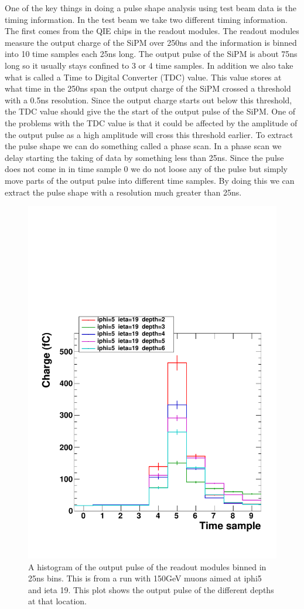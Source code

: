 One of the key things in doing a pulse shape analysis using test beam data is the timing information. In the test beam we take two different timing information. The first comes from the QIE chips in the readout modules. The readout modules measure the output charge of the SiPM over 250ns and the information is binned into 10 time samples each 25ns long. The output pulse of the SiPM is about 75ns long so it usually stays confined to 3 or 4 time samples. In addition we also take what is called a Time to Digital Converter (TDC) value. This value stores at what time in the 250ns span the output charge of the SiPM crossed a threshold with a 0.5ns resolution. Since the output charge starts out below this threshold, the TDC value should give the the start of the output pulse of the SiPM. One of the problems with the TDC value is that it could be affected by the amplitude of the output pulse as a high amplitude will cross this threshold earlier. To extract the pulse shape we can do something called a phase scan. In a phase scan we delay starting the taking of data by something less than 25ns. Since the pulse does not come in in time sample 0 we do not loose any of the pulse but simply move parts of the output pulse into different time samples. By doing this we can extract the pulse shape with a resolution much greater than 25ns. 

\begin{figure}
\centering
\includegraphics[width=0.7\linewidth]{Figures/Pulse.pdf}
\caption{A histogram of the output pulse of the readout modules binned in 25ns bins. This is from a run with 150GeV muons aimed at iphi5 and ieta 19. This plot shows the output pulse of the different depths at that location.}
\label{fig:PulSh}
\end{figure}

